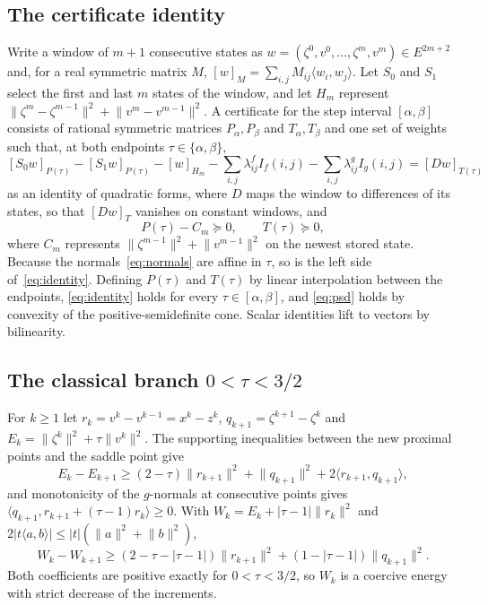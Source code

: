\documentclass[11pt]{article}
\numberwithin{equation}{section}
\theoremstyle{definition}
\theoremstyle{remark}
\newcommand{\ip}[2]{\langle #1,#2\rangle}
\newcommand{\norm}[1]{\lVert #1\rVert}
\begin{document}
\subsection{The certificate identity}
Write a window of $m+1$ consecutive states as $w=(\zeta^0,v^0,\dots,\zeta^m,v^m)\in E^{2m+2}$ and, for a real symmetric matrix $M$, $[w]_M=\sum_{i,j}M_{ij}\ip{w_i}{w_j}$. Let $S_0$ and $S_1$ select the first and last $m$ states of the window, and let $H_m$ represent $\norm{\zeta^m-\zeta^{m-1}}^2+\norm{v^m-v^{m-1}}^2$. A certificate for the step interval $[\alpha,\beta]$ consists of rational symmetric matrices $P_\alpha,P_\beta$ and $T_\alpha,T_\beta$ and one set of weights such that, at both endpoints $\tau\in\{\alpha,\beta\}$,
\begin{equation}\label{eq:identity}
[S_0w]_{P(\tau)}-[S_1w]_{P(\tau)}-[w]_{H_m}-\sum_{i,j}\lambda^f_{ij}I_f(i,j)-\sum_{i,j}\lambda^g_{ij}I_g(i,j)=[Dw]_{T(\tau)}
\end{equation}
as an identity of quadratic forms, where $D$ maps the window to differences of its states, so that $[Dw]_{T}$ vanishes on constant windows, and
\begin{equation}\label{eq:psd}
P(\tau)-C_m\succeq0,\qquad T(\tau)\succeq0,
\end{equation}
where $C_m$ represents $\norm{\zeta^{m-1}}^2+\norm{v^{m-1}}^2$ on the newest stored state. Because the normals~\eqref{eq:normals} are affine in $\tau$, so is the left side of~\eqref{eq:identity}. Defining $P(\tau)$ and $T(\tau)$ by linear interpolation between the endpoints, \eqref{eq:identity} holds for every $\tau\in[\alpha,\beta]$, and \eqref{eq:psd} holds by convexity of the positive-semidefinite cone. Scalar identities lift to vectors by bilinearity.

\subsection{The classical branch \texorpdfstring{$0<\tau<3/2$}{0 < tau < 3/2}}\label{sec:classical}
For $k\ge1$ let $r_k=v^k-v^{k-1}=x^k-z^k$, $q_{k+1}=\zeta^{k+1}-\zeta^k$ and $E_k=\norm{\zeta^k}^2+\tau\norm{v^k}^2$. The supporting inequalities between the new proximal points and the saddle point give
\[
E_k-E_{k+1}\ge(2-\tau)\norm{r_{k+1}}^2+\norm{q_{k+1}}^2+2\ip{r_{k+1}}{q_{k+1}},
\]
and monotonicity of the $g$-normals at consecutive points gives $\ip{q_{k+1}}{r_{k+1}+(\tau-1)r_k}\ge0$. With $W_k=E_k+|\tau-1|\norm{r_k}^2$ and $2|t\ip ab|\le|t|(\norm a^2+\norm b^2)$,
\[
W_k-W_{k+1}\ge(2-\tau-|\tau-1|)\norm{r_{k+1}}^2+(1-|\tau-1|)\norm{q_{k+1}}^2.
\]
Both coefficients are positive exactly for $0<\tau<3/2$, so $W_k$ is a coercive energy with strict decrease of the increments.
\end{document}
